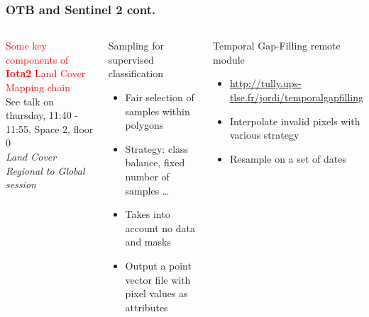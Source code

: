\documentclass[8pt,aspectratio=169]{beamer}
\begin{document}
      \begin{frame}
        \frametitle{OTB and Sentinel 2 cont.}
        \begin{columns}

          \begin{center}
          \textcolor{red}{Some key components of \textbf{Iota2} Land Cover Mapping chain}\\
          \small{See talk on thursday, 11:40 - 11:55, Space 2, floor 0\\ \emph{Land Cover Regional to Global session}}
          \end{center}

          \begin{block}{Sampling for supervised classification}
            \begin{itemize}
            \item Fair selection of samples within polygons
            \item Strategy: class balance, fixed number of samples \ldots
            \item Takes into account no data and masks
            \item Output a point vector file with pixel values as attributes
            \end{itemize}
        \end{block}
        
        \begin{block}{Temporal Gap-Filling remote module}
          \begin{itemize}
          \item \small{\url{http://tully.ups-tlse.fr/jordi/temporalgapfilling}}
          \item Interpolate invalid pixels with various strategy
          \item Resample on a set of dates
          \end{itemize}
          
        \end{block}
        

\end{columns}
\end{frame}
\end{document}
